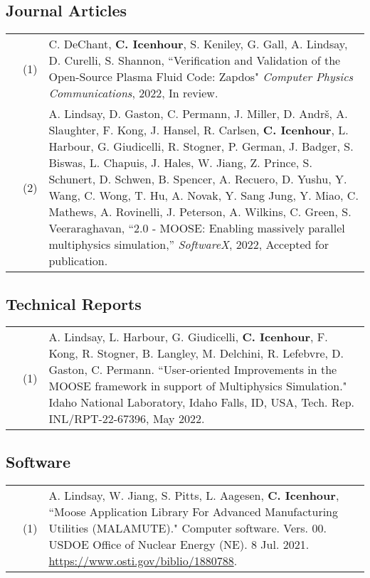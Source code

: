 \documentclass{article}
\begin{document}
\subsection*{Journal Articles}

  \begin{tabularx}{\textwidth}{l l X}
    \hspace{2em}
      & (1) &  C. DeChant, \textbf{C. Icenhour}, S. Keniley, G. Gall, A. Lindsay, D. Curelli, S. Shannon, ``Verification and Validation of the Open-Source Plasma Fluid Code: Zapdos" \textit{Computer Physics Communications}, 2022, In review.\\
	  & (2) &  A. Lindsay, D. Gaston, C. Permann, J. Miller, D. Andr\v{s}, A. Slaughter, F. Kong, J. Hansel, R. Carlsen, \textbf{C. Icenhour}, L. Harbour, G. Giudicelli, R. Stogner, P. German, J. Badger, S. Biswas, L. Chapuis, J. Hales, W. Jiang, Z. Prince, S. Schunert, D. Schwen, B. Spencer, A. Recuero, D. Yushu, Y. Wang, C. Wong, T. Hu, A. Novak, Y. Sang Jung, Y. Miao, C. Mathews, A. Rovinelli, J. Peterson, A. Wilkins, C. Green, S. Veeraraghavan, ``2.0 - MOOSE: Enabling massively parallel multiphysics simulation,'' \textit{SoftwareX}, 2022, Accepted for publication. \\
  \end{tabularx}

\subsection*{Technical Reports}

  \begin{tabularx}{\textwidth}{l l X}
    \hspace{2em}
      & (1) & A. Lindsay, L. Harbour, G. Giudicelli, \textbf{C. Icenhour}, F. Kong, R. Stogner, B. Langley, M. Delchini, R. Lefebvre, D. Gaston, C. Permann. ``User-oriented Improvements in the MOOSE framework in support of Multiphysics Simulation." Idaho National Laboratory, Idaho Falls, ID, USA, Tech. Rep. INL/RPT-22-67396, May 2022. \\
  \end{tabularx}

\subsection*{Software}

  \begin{tabularx}{\textwidth}{l l X}
	\hspace{2em}
	  & (1) & A. Lindsay, W. Jiang, S. Pitts, L. Aagesen, \textbf{C. Icenhour}, ``Moose Application Library For Advanced Manufacturing Utilities (MALAMUTE)." Computer software. Vers. 00. USDOE Office of Nuclear Energy (NE). 8 Jul. 2021. \url{https://www.osti.gov/biblio/1880788}.
  \end{tabularx}
\end{document}
